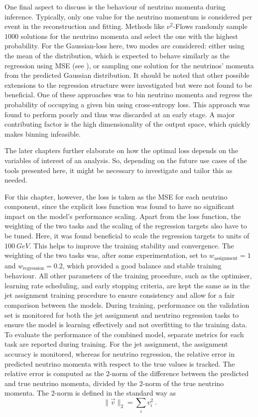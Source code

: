 One final aspect to discuss is the behaviour of neutrino momenta during inference. Typically, only one value for the neutrino momentum is considered per event in the reconstruction and fitting. Methods like $\nu^2$-Flows randomly sample $1000$ solutions for the neutrino momenta and select the one with the highest probability. For the Gaussian-loss here, two modes are considered: either using the mean of the distribution, which is expected to behave similarly as the regression using MSE (see ), or sampling one solution for the neutrinos'
momenta from the predicted Gaussian distribution.
It should be noted that other possible extensions to the regression structure were investigated but were not found to be beneficial. One of these approaches was to bin neutrino momenta and regress the probability of occupying a given bin using cross-entropy loss. This approach was found to perform poorly and thus was discarded at an early stage. A major contributing factor is the high dimensionality of the output space, which quickly makes binning infeasible.

The later chapters further elaborate on how the optimal loss depends on the variables of interest of an analysis. So, depending on the future use cases of the tools presented here, it might be necessary to investigate and tailor this as needed.

For this chapter, however, the loss is taken as the MSE for each neutrino component, since the explicit loss function was found to have no significant impact on the model's performance scaling. Apart from the loss function, the weighting of the two tasks and the scaling of the regression targets also have to be tuned. Here, it was found beneficial to scale the regression targets to units of $100 ~\unit{GeV}$. This helps to improve the training stability and convergence. The weighting of the two tasks was, after some experimentation, set to $w_{\text{assignment}}=1$ and $w_{\text{regression}}=0.2$, which provided a good balance and stable training behaviour. All other parameters of the training procedure, such as the optimiser, learning rate scheduling, and early stopping criteria, are kept the same as in the jet assignment training procedure to ensure consistency and allow for a fair comparison between the models.
During training, performance on the validation set is monitored for both the jet assignment and neutrino regression tasks to ensure the model is learning effectively and not overfitting to the training data. To evaluate the performance of the combined model, separate metrics for each task are reported during training. For the jet assignment, the assignment accuracy is monitored, whereas for neutrino regression, the relative error in predicted neutrino momenta with respect to the true values is tracked. The relative error is computed as the 2-norm of the difference between the predicted and true neutrino momenta, divided by the 2-norm of the true neutrino momenta. The 2-norm is defined in the standard way as  
\begin{equation}
    \|\vec v\|_{2}=\sum_i v_i^2~.
\end{equation}

